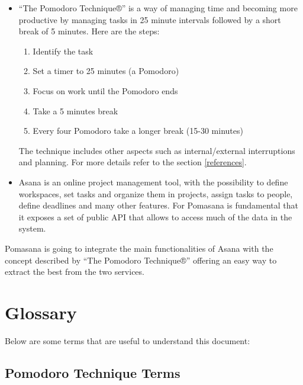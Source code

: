 		\begin{itemize}

				\item “The Pomodoro Technique®” is a way of managing time and becoming more productive by managing tasks in 25 minute intervals followed by a short break of 5 minutes.	Here are the steps:

					\begin{enumerate}

						\item Identify the task

						\item Set a timer to 25 minutes (a Pomodoro)

						\item Focus on work until the Pomodoro ends

						\item Take a 5 minutes break

						\item Every four Pomodoro take a longer break (15-30 minutes)

					\end{enumerate}

				The technique includes other aspects such as internal/external interruptions and planning. For more details refer to the section \ref{references}. 
				
				\item Asana is an online project management tool, with the possibility to define workspaces, set tasks and organize them in projects, assign tasks to people, define deadlines and many other features. 
				For Pomasana is fundamental that it exposes a set of public API that allows to access much of the data in the system.

		\end{itemize}

		Pomasana is going to integrate the main functionalities of Asana with the concept described by “The Pomodoro Technique®” offering an easy way to extract the best from the two services.



\section{Glossary}
Below are some terms that are useful to understand this document:

	\subsection{Pomodoro Technique Terms}

